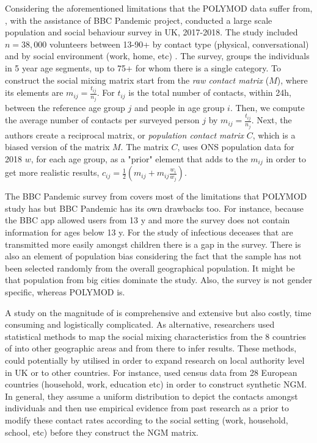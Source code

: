 \documentclass[12pt]{article}
\begin{document}
Considering the aforementioned limitations that the POLYMOD data suffer from, \cite{Klepac2020}, with the assistance of BBC Pandemic project, conducted a large scale population and social behaviour survey in UK, 2017-2018. The study included $n=38,000$ volunteers between 13-90+ by contact type (physical, conversational) and by social environment (work, home, etc) . The survey, groups the individuals in 5 year age segments, up to 75+ for whom there is a single category. To construct the social mixing matrix \cite{Klepac2020} start from the \textit{raw contact matrix} ($M$), where its elements are $m_{ij}=\frac{t_{ij}}{n_{j}}$. For $t_{ij}$ is the total number of contacts, within 24h, between the reference age group $j$ and people in age group $i$. Then, we compute the average number of contacts per surveyed person $j$ by $m_{ij}=\frac{t_{ij}}{n_{j}}$. Next, the authors create a reciprocal matrix, or \textit{population contact matrix} $C$, which is a biased version of the matrix $M$. The matrix $C$, uses ONS population data for 2018 $w$, for each age group, as a "prior" element that adds to the $m_{ij}$ in order to get more realistic results, $c_{ij}=\frac{1}{2}(m_{ij} + m_{ij}\frac{w_{i}}{w_{j}})$. 

The BBC Pandemic survey from \cite{Klepac2020} covers most of the limitations that POLYMOD study \cite{Diekmann:2010} has but BBC Pandemic has its own drawbacks too. For instance, because the BBC app allowed users from 13 y and more the survey does not contain information for ages below 13 y. For the study of infectious deceases that are transmitted more easily amongst children there is a gap in the survey. There is also an element of population bias considering the fact that the sample has not been selected randomly from the overall geographical population. It might be that population from big cities dominate the study. Also, the survey is not gender specific, whereas POLYMOD is. 

A study on the magnitude of \cite{Klepac2020} is comprehensive and extensive but also costly, time consuming and logistically complicated. As alternative, researchers used statistical methods to map the social mixing characteristics from the 8 countries of \cite{Diekmann:2010} into other geographic areas and from there to infer results. These methods, could potentially by utilised in order to expand research on local authority level in UK or to other countries. For instance, \cite{Fumanelli:2012} used census data from 28 European countries (household, work, education etc) in order to construct synthetic NGM. In general, they assume a uniform distribution to depict the contacts amongst individuals and then use empirical evidence from past research as a prior to modify these contact rates according to the social setting (work, household, school, etc) before they construct the NGM matrix.
\end{document}
